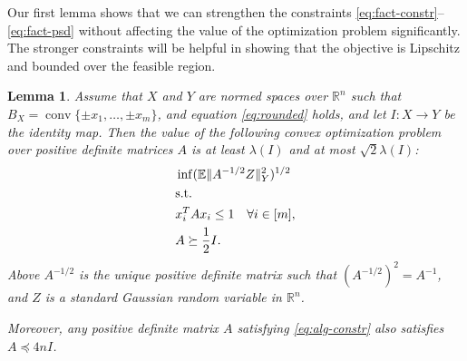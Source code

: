 \documentclass[11pt]{article}
\newtheorem{lemma}[theorem]{Lemma}
\newcommand{\R}{{\mathbb{R}}}
\newcommand{\E}{\mathbb{E}}
\DeclareMathOperator{\conv}{conv}
\begin{document}
Our first lemma shows that we can strengthen the constraints
\eqref{eq:fact-constr}--\eqref{eq:fact-psd} without affecting the
value of the optimization problem significantly. The stronger
constraints will be helpful in showing that the objective is Lipschitz
and bounded over the feasible region. 

\begin{lemma}\label{lm:psd-lb}
  Assume that $X$ and $Y$ are normed spaces over $\R^n$ such that $B_X
  = \conv\{\pm x_1, \ldots, \pm x_m\}$, and equation
  \eqref{eq:rounded} holds, and let $I:X \to Y$ be the identity
  map. Then the value of the following convex optimization problem
  over positive definite matrices $A$ is at least $\lambda(I)$ and at
  most $\sqrt{2} \lambda(I)$:
  \begin{align}
    &\inf  (\E\|A^{-1/2} Z\|^2_Y)^{1/2}  \label{eq:alg-obj}\\
    &\text{s.t.}\notag\\
    &x_i^T A x_i \le 1 \ \ \ \forall i \in [m],\label{eq:alg-constr}\\
    &A \succeq \frac12 I.\label{eq:alg-psd}
  \end{align}
  Above $A^{-1/2}$ is the unique positive definite matrix such that
  $(A^{-1/2})^2 = A^{-1}$, and $Z$ is a standard Gaussian random
  variable in $\R^n$.

  Moreover, any positive definite matrix $A$ satisfying
  \eqref{eq:alg-constr} also satisfies $A \preceq 4n I$. 
\end{lemma}
\end{document}
